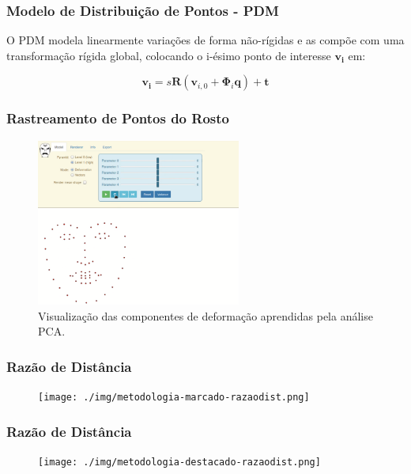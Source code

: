 \documentclass[brazil]{beamer}
\begin{document}
\begin{frame}
\frametitle{Modelo de Distribuição de Pontos - PDM}

\begin{definition}
  O PDM modela linearmente variações de forma não-rígidas e as compõe com uma transformação rígida global, colocando o i-ésimo ponto de interesse
$\bm{v_i}$ em:

\begin{equation}
 \bm{v_i} = s \bm{R} ( \bm{v}_{i,0} + \bm{\Phi}_i \bm{q}) + \bm{t}
\label{eq:PDM-equation}
\end{equation}
\end{definition}
\end{frame}

\begin{frame}
\frametitle{Rastreamento de Pontos do Rosto}
      \begin{figure}
          \centering
          \includegraphics[width = 0.6\textwidth, keepaspectratio]{./img/pca_exaplained.png}
          \caption{Visualização das componentes de deformação aprendidas pela análise PCA.}
      \end{figure}
\end{frame}

\begin{frame}
\frametitle{Razão de Distância}
        \begin{figure}
            \centering
            \texttt{[image: ./img/metodologia-marcado-razaodist.png]}
      \end{figure}
\end{frame}

\begin{frame}
\frametitle{Razão de Distância}
        \begin{figure}
            \centering
            \texttt{[image: ./img/metodologia-destacado-razaodist.png]}
      \end{figure}
\end{frame}
\end{document}
